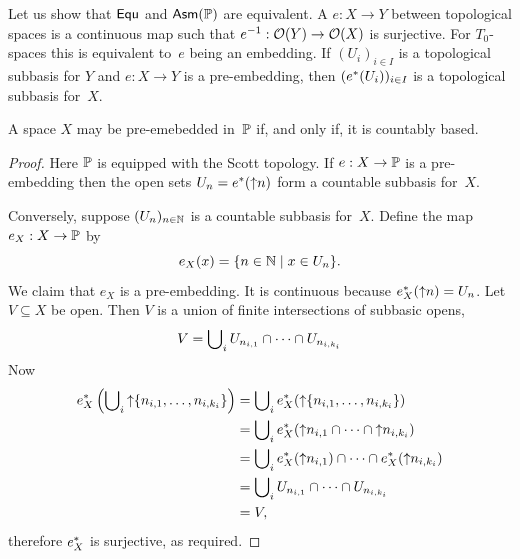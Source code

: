 Let us show that $\mathsf{Equ}$ and $\mathsf{Asm}(\mathbb{P})$ are equivalent. A
 $e : X \to Y$ between topological spaces is a
continuous map such that ${e}^{-1} : \mathcal{O}(Y) \to \mathcal{O}(X)$ is
surjective. For $T_0$-spaces this is equivalent to~$e$ being an
embedding. If $(U_i)_{i \in I}$ is a topological subbasis for $Y$ and
$e : X \to Y$ is a pre-embedding, then $(e^{*}(U_i))_{i \in I}$ is
a topological subbasis for~$X$.

\begin{theorem}
  \label{thm:scott-embedding}%
  A space $X$ may be pre-emebedded in~$\mathbb{P}$ if, and only if, it is
  countably based.
\end{theorem}

\begin{proof}
  Here $\mathbb{P}$ is equipped with the Scott topology. If $e : X \to
  \mathbb{P}$ is a pre-embedding then the open sets $U_n =
  e^{*}({\uparrow}n)$ form a countable subbasis for~$X$.

  Conversely, suppose $(U_n)_{n \in \mathbb{N}}$ is a countable subbasis
  for~$X$. Define the map $e_X : X \to \mathbb{P}$ by
  \begin{equation*}
    e_X(x) = \{n \in \mathbb{N} \mid x \in U_n\}.
  \end{equation*}
  We claim that $e_X$ is a pre-embedding. It is continuous because
  $e_X^{*}({\uparrow}n) = U_n$. Let $V \subseteq X$ be open. Then 
  $V$ is a union of finite intersections of subbasic opens,
  \begin{equation*}
    V = \bigcup\nolimits_i U_{n_{i,1}} \cap \cdots \cap U_{n_{i,k_i}}
  \end{equation*}
  Now
  \begin{align*}
    e_X^{*}\left(\bigcup\nolimits_i {\uparrow}\{n_{i,1}, \ldots, n_{i,k_i}\}\right) &=
      \bigcup\nolimits_i e_X^{*}({\uparrow}\{n_{i,1}, \ldots, n_{i,k_i}\})
      \\
      &=
      \bigcup\nolimits_i e_X^{*}({\uparrow}n_{i,1} \cap \cdots \cap {\uparrow}n_{i,k_i})
      \\
      &=
      \bigcup\nolimits_i e_X^{*}({\uparrow}n_{i,1}) \cap \cdots \cap e_X^{*}({\uparrow}n_{i,k_i})
      \\
      &=
      \bigcup\nolimits_i U_{n_{i,1}} \cap \cdots \cap U_{n_{i,k_i}} \\
      &= V,
  \end{align*}
  therefore $e_X^{*}$ is surjective, as required.
\end{proof}

